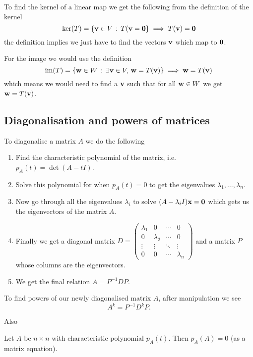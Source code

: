 \documentclass[10pt, a4paper]{article}
\begin{document}
To find the kernel of a linear map we get the following from the definition of the kernel
\[
\mathrm{ker}(T) = \{\mathbf{v} \in V\,:\,T(\mathbf{v} = \mathbf{0}\} \implies T(\mathbf{v}) = \mathbf{0}
\]
the definition implies we just have to find the vectors $\mathbf{v}$ which map to $\mathbf{0}$.

For the image we would use the definition
\[
\mathrm{im}(T) = \{\mathbf{w} \in W\,:\,\exists\mathbf{v} \in V,\,\mathbf{w} = T(\mathbf{v})\} \implies \mathbf{w} = T(\mathbf{v})
\]
which means we would need to find a $\mathbf{v}$ such that for all $\mathbf{w} \in W$ we get $\mathbf{w} = T(\mathbf{v})$.

\subsection{Diagonalisation and powers of matrices}

To diagonalise a matrix $A$ we do the following
\begin{enumerate}[label = (\arabic*)]
    \item
    Find the characteristic polynomial of the matrix,
    i.e. $p_A(t) = \det(A - tI)$.

    \item
    Solve this polynomial for when $p_A(t) = 0$ to get the eigenvalues $\lambda_1, \dotsc, \lambda_n$.

    \item
    Now go through all the eigenvalues $\lambda_i$ to solve $(A - \lambda_iI)\mathbf{x} = \mathbf{0}$ which gets us the eigenvectors of the matrix $A$.

    \item
    Finally we get a diagonal matrix $D = \begin{pmatrix}
        \lambda_1 & 0 & \dotsi & 0 \\
        0 & \lambda_2 & \dotsi & 0 \\
        \vdots & \vdots & \ddots & \vdots \\
        0 & 0 & \dotsi & \lambda_n
    \end{pmatrix}$
    and a matrix $P$ whose columns are the eigenvectors.

    \item
    We get the final relation $A = P ^ {-1}DP$.
\end{enumerate}

To find powers of our newly diagonalised matrix $A$,
after manipulation we see
\[
A ^ k = P ^ {-1}D ^ kP.
\]

Also
\begin{theorem}
    Let $A$ be $n \times n$ with characteristic polynomial $p_A(t)$.
    Then $p_A(A) = 0$
    (as a matrix equation).
\end{theorem}
\end{document}
